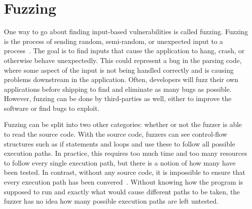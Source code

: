 \section{Fuzzing}
\label{sec:fuzzing}
One way to go about finding input-based vulnerabilities is called fuzzing.  Fuzzing is the process of sending random, semi-random, or unexpected input to a process~\cite[p 21--22]{fuzzing}.  The goal is to find inputs that cause the application to hang, crash, or otherwise behave unexpectedly.  This could represent a bug in the parsing code, where some aspect of the input is not being handled correctly and is causing problems downstream in the application.  Often, developers will fuzz their own applications before shipping to find and eliminate as many bugs as possible.  However, fuzzing can be done by third-parties as well, either to improve the software or find bugs to exploit.

Fuzzing can be split into two other categories: whether or not the fuzzer is able to read the source code.  With the source code, fuzzers can see control-flow structures such as if statements and loops and use these to follow all possible execution paths.  In practice, this requires too much time and too many resources to follow every single execution path, but there is a notion of how many have been tested.  In contrast, without any source code, it is impossible to ensure that every execution path has been convered~\cite{godefroid2012sage}.  Without knowing how the program is supposed to run and exactly what would cause different paths to be taken, the fuzzer has no idea how many possible execution paths are left untested.
